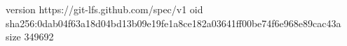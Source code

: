 version https://git-lfs.github.com/spec/v1
oid sha256:0dab04f63a18d04bd13b09e19fe1a8ce182a03641ff00be74f6e968e89cac43a
size 349692
